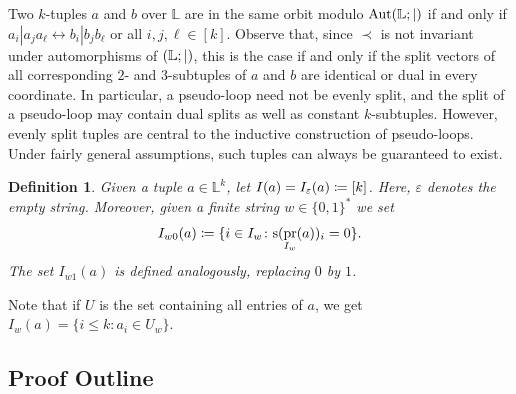 \documentclass[a4paper,reqno, cleveref]{amsart}
\newcommand{\coloneqq}{\mathrel{\mathop:}\mathrel{\mkern-1.2mu}=}
\newtheorem{definition}[theorem]{Definition}
\newcommand{\br}[1]{[#1]}
\newcommand{\struct}[1]{\mathbb{#1}}
\newcommand{\s}{\ensuremath{\mathrm{s}}\xspace}
\DeclareMathOperator{\pr}{pr}
\DeclareMathOperator{\Aut}{Aut}
\newcommand{\sL}{\mathbb L}
\newcommand{\Phylo}[1]{\ensuremath{(\struct{L};|)}#1}
\begin{document}
 
 Two $k$-tuples $a$ and $b$ over $\sL$ are in the same orbit modulo $\Aut\Phylo$ if and only if $a_i|a_j a_\ell\leftrightarrow b_i|b_j b_\ell$  or all $i,j,\ell\in \br k$. Observe that, since $\prec$  is not invariant under automorphisms of $\Phylo$, this is the case if and only if the split vectors of all corresponding $2$- and $3$-subtuples of $a$ and $b$ are identical or dual in every coordinate. 
 In particular, a pseudo-loop need not be evenly split, and the split of a pseudo-loop may contain dual splits as well as constant $k$-subtuples.
 However, evenly split tuples are central to the inductive construction of pseudo-loops. Under fairly general assumptions, such tuples can always be guaranteed to exist. 
 



\begin{definition}\label{def:Iw}
    Given a tuple $a\in \sL^k$, let $I(a)=I_\varepsilon(a)\coloneqq [k]$. 
    Here, $\varepsilon$ denotes the empty string. 
    Moreover, given a finite string $w\in\{0,1\}^*$ we set
    \[
        I_{w0}(a)\coloneqq \{i\in I_w\colon \s(\pr_{I_w}(a))_i=0\}.
    \]
    The set $I_{w1}(a)$ is defined analogously, replacing $0$ by $1$. 
\end{definition}

Note that if $U$ is the set containing all entries of $a$, we get $I_w(a)=\{i\leq k\colon a_i\in U_w\}$. 




\subsection{Proof Outline}\label{sect:phylo:outline}
\end{document}
